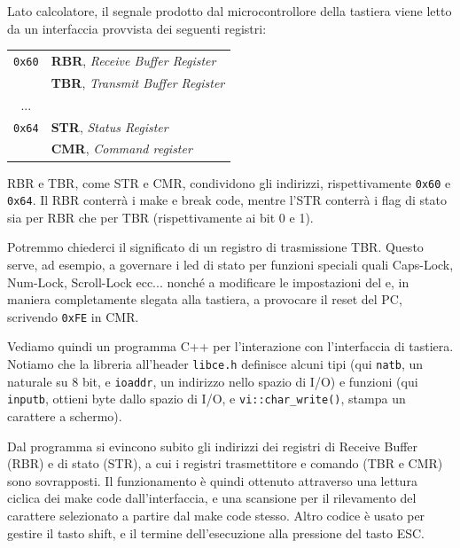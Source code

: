 \documentclass[a4paper,11pt]{article}
\begin{document}
Lato calcolatore, il segnale prodotto dal microcontrollore della tastiera viene letto da un interfaccia provvista dei seguenti registri:
\begin{table}[H]
	\center 
	\begin{tabular} { c | p{7cm} }
		\lstinline|0x60| & \textbf{RBR}, \textit{Receive Buffer Register} \\ 
		& \textbf{TBR}, \textit{Transmit Buffer Register} \\ 
		\hline
		... & \\
		\hline
		\lstinline|0x64| & \textbf{STR}, \textit{Status Register} \\
		& \textbf{CMR}, \textit{Command register}
	\end{tabular}
\end{table}

RBR e TBR, come STR e CMR, condividono gli indirizzi, rispettivamente \lstinline|0x60| e \lstinline|0x64|.
Il RBR conterrà i make e break code, mentre l'STR conterrà i flag di stato sia per RBR che per TBR (rispettivamente ai bit 0 e 1).

Potremmo chiederci il significato di un registro di trasmissione TBR.
Questo serve, ad esempio, a governare i led di stato per funzioni speciali quali Caps-Lock, Num-Lock, Scroll-Lock ecc... nonché a modificare le impostazioni del  e, in maniera completamente slegata alla tastiera, a provocare il reset del PC, scrivendo \lstinline|0xFE| in CMR.

Vediamo quindi un programma C++ per l'interazione con l'interfaccia di tastiera.
Notiamo che la libreria all'header \lstinline|libce.h| definisce alcuni tipi (qui \lstinline|natb|, un naturale su 8 bit, e \lstinline|ioaddr|, un indirizzo nello spazio di I/O) e funzioni (qui \lstinline|inputb|, ottieni byte dallo spazio di I/O, e \lstinline|vi::char_write()|, stampa un carattere a schermo).

\lstset{language=C++}


Dal programma si evincono subito gli indirizzi dei registri di Receive Buffer (RBR) e di stato (STR), a cui i registri trasmettitore e comando (TBR e CMR) sono sovrapposti.
Il funzionamento è quindi ottenuto attraverso una lettura ciclica dei make code dall'interfaccia, e una scansione per il rilevamento del carattere selezionato a partire dal make code stesso.
Altro codice è usato per gestire il tasto shift, e il termine dell'esecuzione alla pressione del tasto ESC.
\end{document}
